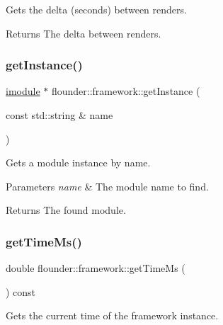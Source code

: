 Gets the delta (seconds) between renders. 

\begin{DoxyReturn}{Returns}
The delta between renders. 
\end{DoxyReturn}
\mbox{\label{classflounder_1_1framework_a84a2314d26174ab02b48bcda8fd5b4e4}} 
\subsubsection{\texorpdfstring{get\+Instance()}{getInstance()}}
{\footnotesize\ttfamily \hyperlink{classflounder_1_1imodule}{imodule} $\ast$ flounder\+::framework\+::get\+Instance (\begin{DoxyParamCaption}\item[{const std\+::string \&}]{name }\end{DoxyParamCaption})}



Gets a module instance by name. 


\begin{DoxyParams}{Parameters}
{\em name} & The module name to find. \\
\hline
\end{DoxyParams}
\begin{DoxyReturn}{Returns}
The found module. 
\end{DoxyReturn}
\mbox{\label{classflounder_1_1framework_a1f60ddf8e191eb9182b3e90007d8f9a1}} 
\subsubsection{\texorpdfstring{get\+Time\+Ms()}{getTimeMs()}}
{\footnotesize\ttfamily double flounder\+::framework\+::get\+Time\+Ms (\begin{DoxyParamCaption}{ }\end{DoxyParamCaption}) const\hspace{0.3cm}{\ttfamily [inline]}}



Gets the current time of the framework instance. 

